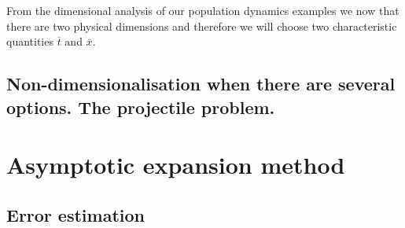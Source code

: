 From the dimensional analysis of our population dynamics examples we now that
there are two physical dimensions and therefore we will choose two
characteristic quantities $\overline{t}$ and $\overline{x}$.

\subsection{Non-dimensionalisation when there are several options. The
projectile problem.}

\section{Asymptotic expansion method}

\subsection{Error estimation}
